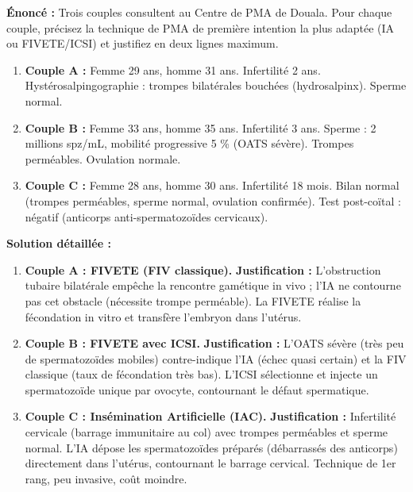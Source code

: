 \documentclass[11pt]{article}
\begin{document}
\begin{exoresolu}
\textbf{Énoncé :} Trois couples consultent au Centre de PMA de Douala. Pour chaque couple, précisez la technique de PMA de première intention la plus adaptée (IA ou FIVETE/ICSI) et justifiez en deux lignes maximum.

\begin{enumerate}
    \item \textbf{Couple A :} Femme 29 ans, homme 31 ans. Infertilité 2 ans. Hystérosalpingographie : trompes bilatérales bouchées (hydrosalpinx). Sperme normal.
    \item \textbf{Couple B :} Femme 33 ans, homme 35 ans. Infertilité 3 ans. Sperme : 2 millions spz/mL, mobilité progressive 5 \% (OATS sévère). Trompes perméables. Ovulation normale.
    \item \textbf{Couple C :} Femme 28 ans, homme 30 ans. Infertilité 18 mois. Bilan normal (trompes perméables, sperme normal, ovulation confirmée). Test post-coïtal : négatif (anticorps anti-spermatozoïdes cervicaux).
\end{enumerate}

\tcblower

\textbf{Solution détaillée :}

\begin{enumerate}
    \item \textbf{Couple A : FIVETE (FIV classique).} \textbf{Justification :} L'obstruction tubaire bilatérale empêche la rencontre gamétique in vivo ; l'IA ne contourne pas cet obstacle (nécessite trompe perméable). La FIVETE réalise la fécondation in vitro et transfère l'embryon dans l'utérus.
    \item \textbf{Couple B : FIVETE avec ICSI.} \textbf{Justification :} L'OATS sévère (très peu de spermatozoïdes mobiles) contre-indique l'IA (échec quasi certain) et la FIV classique (taux de fécondation très bas). L'ICSI sélectionne et injecte un spermatozoïde unique par ovocyte, contournant le défaut spermatique.
    \item \textbf{Couple C : Insémination Artificielle (IAC).} \textbf{Justification :} Infertilité cervicale (barrage immunitaire au col) avec trompes perméables et sperme normal. L'IA dépose les spermatozoïdes préparés (débarrassés des anticorps) directement dans l'utérus, contournant le barrage cervical. Technique de 1er rang, peu invasive, coût moindre.
\end{enumerate}
\end{exoresolu}
\end{document}
